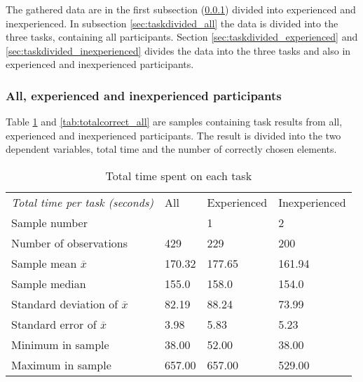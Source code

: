  The gathered data are in the first subsection (\ref{sec:alltasks}) divided into experienced and inexperienced. In subsection \ref{sec:taskdivided_all} the data is divided into the three tasks, containing all participants. Section \ref{sec:taskdivided_experienced}  and \ref{sec:taskdivided_inexperienced} divides the data into the three tasks and also in experienced and inexperienced participants. 
 

\subsubsection{All,  experienced and inexperienced participants}\label{sec:alltasks}

Table \ref{tab:totaltime_all} and \ref{tab:totalcorrect_all} are samples containing task results from all, experienced and inexperienced participants. The result is divided into the two dependent variables, total time and the number of correctly chosen elements.

\begin{table}[H]
	\centering
	\begin{tabular}{l|l|l|l}
		\textit{Total time per task (seconds) } & All  & Experienced & Inexperienced \\ 
		Sample number &   & 1  & 2   \\ \hline
		Number of observations & 429    & 229    & 200   \\
		Sample mean $\overline{x}$     & 170.32 & 177.65  & 161.94     \\
		Sample median  & 155.0 & 158.0  & 154.0  \\
		Standard deviation of $\overline{x}$  & 82.19  & 88.24  & 73.99   \\
		Standard error of $\overline{x}$  & 3.98  & 5.83 & 5.23  \\
		Minimum in sample & 38.00  & 52.00  & 38.00     \\
		Maximum in sample & 657.00 & 657.00  & 529.00    \\ \hline
	\end{tabular}
	\caption[Total time, all participants]{Total time spent on each task}
	\label{tab:totaltime_all}
\end{table}

